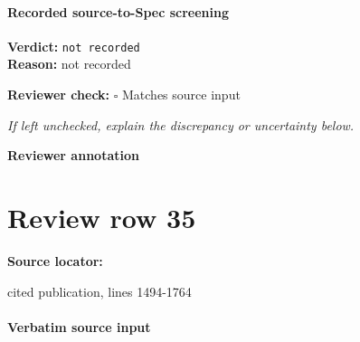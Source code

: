\documentclass[10pt]{article}
\newcommand{\reviewerbox}{%
  \par\noindent\fbox{\parbox{0.96\linewidth}{\rule{0pt}{0.38in}}}\par
}
\newcommand{\reviewmatch}[1]{%
  \par\noindent\textbf{Reviewer check:} $\square$\; #1\par
  \noindent\emph{If left unchecked, explain the discrepancy or uncertainty below.}\par
}
\begin{document}
\paragraph{Recorded source-to-Spec screening}
\textbf{Verdict:} \texttt{not recorded}
\\
\textbf{Reason:} not recorded
\reviewmatch{Matches source input}
\noindent\textbf{Reviewer annotation}\par
\reviewerbox
\clearpage
\hypertarget{source-claim-fb611bb534f07b11}{}
\section*{Review row 35}
\textbf{Source locator:} {\footnotesize\raggedright cited publication, lines 1494-\allowbreak{}1764\par}
\paragraph{Verbatim source input}
\end{document}
